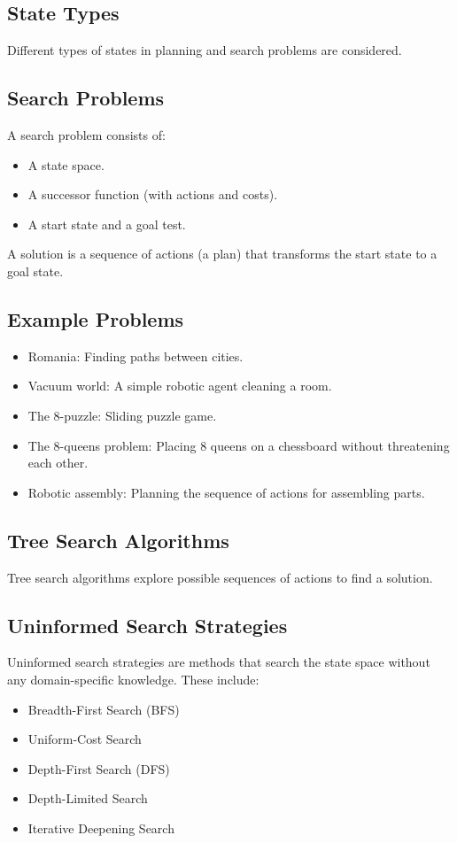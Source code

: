 \documentclass[8pt]{article}
\begin{document}
\subsection*{State Types}
Different types of states in planning and search problems are considered.

\subsection*{Search Problems}
A search problem consists of:
\begin{itemize}
    \item A state space.
    \item A successor function (with actions and costs).
    \item A start state and a goal test.
\end{itemize}
A solution is a sequence of actions (a plan) that transforms the start state to a goal state.

\subsection*{Example Problems}
\begin{itemize}
    \item Romania: Finding paths between cities.
    \item Vacuum world: A simple robotic agent cleaning a room.
    \item The 8-puzzle: Sliding puzzle game.
    \item The 8-queens problem: Placing 8 queens on a chessboard without threatening each other.
    \item Robotic assembly: Planning the sequence of actions for assembling parts.
\end{itemize}

\subsection{Tree Search Algorithms}
Tree search algorithms explore possible sequences of actions to find a solution.

\subsection{Uninformed Search Strategies}
Uninformed search strategies are methods that search the state space without any domain-specific knowledge. These include:
\begin{itemize}
    \item Breadth-First Search (BFS)
    \item Uniform-Cost Search
    \item Depth-First Search (DFS)
    \item Depth-Limited Search
    \item Iterative Deepening Search
\end{itemize}
\end{document}
